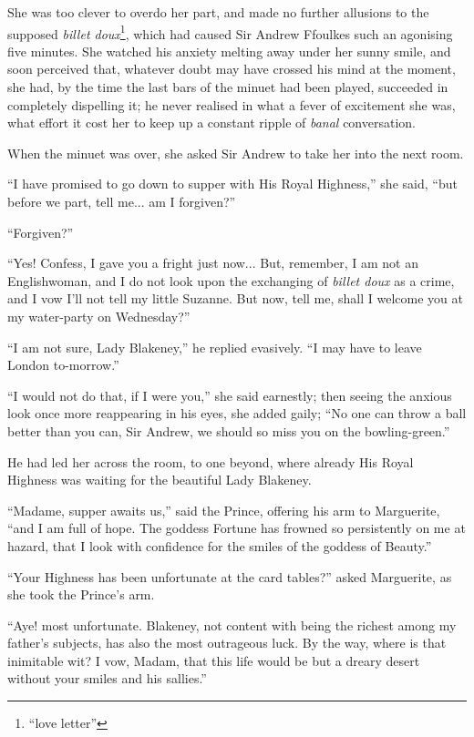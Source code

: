 She was too clever to overdo her part, and made no further allusions to the supposed \textit{billet doux}\footnote{\enquote{love letter}}, which had caused Sir Andrew Ffoulkes such an agonising five minutes. She watched his anxiety melting away under her sunny smile, and soon perceived that, whatever doubt may have crossed his mind at the moment, she had, by the time the last bars of the minuet had been played, succeeded in completely dispelling it; he never realised in what a fever of excitement she was, what effort it cost her to keep up a constant ripple of \textit{banal} conversation.

When the minuet was over, she asked Sir Andrew to take her into the next room.

\enquote{I have promised to go down to supper with His Royal Highness,} she said, \enquote{but before we part, tell me... am I forgiven?}

\enquote{Forgiven?}

\enquote{Yes! Confess, I gave you a fright just now... But, remember, I am not an Englishwoman, and I do not look upon the exchanging of \textit{billet doux} as a crime, and I vow I'll not tell my little Suzanne. But now, tell me, shall I welcome you at my water-party on Wednesday?}

\enquote{I am not sure, Lady Blakeney,} he replied evasively. \enquote{I may have to leave London to-morrow.}

\enquote{I would not do that, if I were you,} she said earnestly; then seeing the anxious look once more reappearing in his eyes, she added gaily; \enquote{No one can throw a ball better than you can, Sir Andrew, we should so miss you on the bowling-green.}

He had led her across the room, to one beyond, where already His Royal Highness was waiting for the beautiful Lady Blakeney.

\enquote{Madame, supper awaits us,} said the Prince, offering his arm to Marguerite, \enquote{and I am full of hope. The goddess Fortune has frowned so persistently on me at hazard, that I look with confidence for the smiles of the goddess of Beauty.}

\enquote{Your Highness has been unfortunate at the card tables?} asked Marguerite, as she took the Prince's arm.

\enquote{Aye! most unfortunate. Blakeney, not content with being the richest among my father's subjects, has also the most outrageous luck. By the way, where is that inimitable wit? I vow, Madam, that this life would be but a dreary desert without your smiles and his sallies.}

